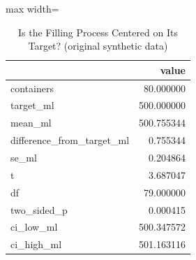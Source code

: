 \begin{table}[htbp]
\centering
\caption{Is the Filling Process Centered on Its Target? (original synthetic data)}
\begingroup
\small
\setlength{\tabcolsep}{6pt}
\renewcommand{\arraystretch}{1.12}
\begin{adjustbox}{max width=\linewidth}
\begin{tabular}{@{}lr@{}}
\toprule
 & value \\
\midrule
containers & 80.000000 \\
target\_ml & 500.000000 \\
mean\_ml & 500.755344 \\
difference\_from\_target\_ml & 0.755344 \\
se\_ml & 0.204864 \\
t & 3.687047 \\
df & 79.000000 \\
two\_sided\_p & 0.000415 \\
ci\_low\_ml & 500.347572 \\
ci\_high\_ml & 501.163116 \\
\bottomrule
\end{tabular}
\end{adjustbox}
\endgroup
\end{table}